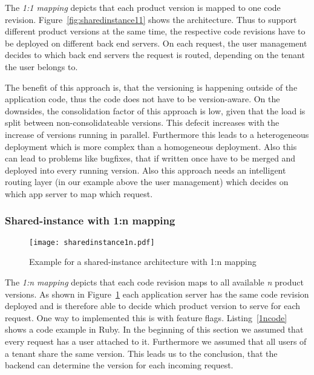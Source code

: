 The \emph{1:1 mapping} depicts that each product version is mapped to one code revision. Figure~\ref{fig:sharedinstance11} shows the architecture. Thus to support different product versions at the same time, the respective code revisions have to be deployed on different back end servers. On each request, the user management decides to which back end servers the request is routed, depending on the tenant the user belongs to.

The benefit of this approach is, that the versioning is happening outside of the application code, thus the code does not have to be version-aware. On the downsides, the consolidation factor of this approach is low, given that the load is split between non-consolidateable versions. This defecit increases with the increase of versions running in parallel. Furthermore this leads to a heterogeneous deployment which is more complex than a homogeneous deployment.  Also this can lead to problems like bugfixes, that if written once have to be merged and deployed into every running version. Also this approach needs an intelligent routing layer (in our example above the user management) which decides on which app server to map which request.

%
%

\subsubsection{Shared-instance with 1:n mapping}
\label{sec:shared1n}

\begin{figure}
\centering
\texttt{[image: sharedinstance1n.pdf]}
\caption{Example for a shared-instance architecture with 1:n mapping}
\label{fig:sharedinstance1n}
\end{figure}

The \emph{1:n mapping} depicts that each code revision maps to all available \emph{n} product versions. As shown in Figure~\ref{fig:sharedinstance1n} each application server has the same code revision deployed and is therefore able to decide which product version to serve for each request. One way to implemented this is with feature flags. Listing~\ref{1ncode} shows a code example in Ruby. In the beginning of this section we assumed that every request has a user attached to it. Furthermore we assumed that all users of a tenant share the same version. This leads us to the conclusion, that the backend can determine the version for each incoming request.

